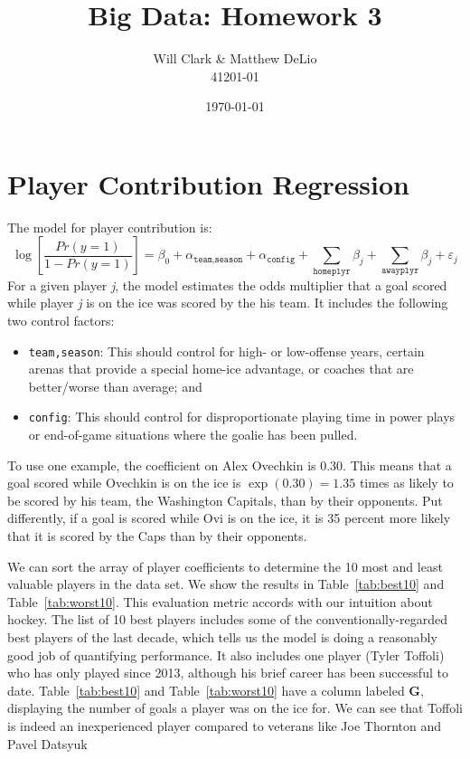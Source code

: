 \documentclass[11pt, fleqn]{article}
\begin{document}
\title{Big Data: Homework 3}
\author{Will Clark \& Matthew DeLio \\ 41201-01}
\date{\today}
\maketitle

\section{Player Contribution Regression}

The model for player contribution is:
\[ \log\left[\frac{Pr(y=1)}{1-Pr(y=1)}\right] = \beta_0 + \alpha_{\texttt{team,season}} + \alpha_{\texttt{config}} + \sum_{\texttt{homeplyr}} \beta_j + \sum_{\texttt{awayplyr}} \beta_j + \varepsilon_j \]
For a given player \textit{j}, the model estimates the odds multiplier that a goal scored while player \textit{j} is on the ice was scored by the his team. It includes the following two control factors:
\begin{itemize}
  \item \texttt{team,season}: This should control for high- or low-offense years, certain arenas that provide a special home-ice advantage, or coaches that are better/worse than average; and
  \item \texttt{config}: This should control for disproportionate playing time in power plays or end-of-game situations where the goalie has been pulled.
\end{itemize}
To use one example, the coefficient on Alex Ovechkin is 0.30. This means that a goal scored while Ovechkin is on the ice is $\exp(0.30)=1.35$ times as likely to be scored by his team, the Washington Capitals, than by their opponents. Put differently, if a goal is scored while Ovi is on the ice, it is 35 percent more likely that it is scored by the Caps than by their opponents.

We can sort the array of player coefficients to determine the 10 most and least valuable players in the data set. We show the results in Table~\ref{tab:best10} and Table~\ref{tab:worst10}. This evaluation metric accords with our intuition about hockey. The list of 10 best players includes some of the conventionally-regarded best players of the last decade, which tells us the model is doing a reasonably good job of quantifying performance. It also includes one player (Tyler Toffoli) who has only played since 2013, although his brief career has been successful to date. Table~\ref{tab:best10} and Table~\ref{tab:worst10} have a column labeled \textbf{G}, displaying the number of goals a player was on the ice for. We can see that Toffoli is indeed an inexperienced player compared to veterans like Joe Thornton and Pavel Datsyuk
\end{document}
